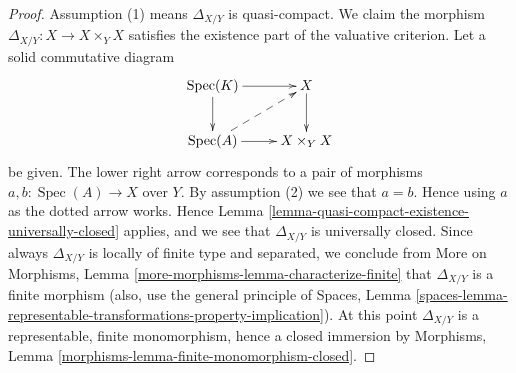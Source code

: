 \documentclass[10pt,a4paper]{amsart}
\theoremstyle{plain}
\theoremstyle{definition}
\theoremstyle{remark}
\numberwithin{equation}{subsection}
\def\Spec{\mathop{\mathrm{Spec}}}
\begin{document}
\begin{proof}
Assumption (1) means $\Delta_{X/Y}$ is quasi-compact.
We claim the morphism
$\Delta_{X/Y} : X \to X \times_Y X$ satisfies the existence
part of the valuative criterion.
Let a solid commutative diagram
$$
\xymatrix{
\Spec(K) \ar[r] \ar[d] & X \ar[d] \\
\Spec(A) \ar[r] \ar@{-->}[ru] & X \times_Y X
}
$$
be given. The lower right arrow corresponds to a
pair of morphisms $a, b : \Spec(A) \to X$ over $Y$.
By assumption (2) we see that $a = b$. Hence using $a$ as the dotted
arrow works. Hence
Lemma \ref{lemma-quasi-compact-existence-universally-closed}
applies, and we see that $\Delta_{X/Y}$ is universally closed.
Since always $\Delta_{X/Y}$ is locally of finite type and
separated, we conclude from
More on Morphisms, Lemma \ref{more-morphisms-lemma-characterize-finite}
that $\Delta_{X/Y}$ is a finite morphism (also, use the
general principle of
Spaces, Lemma
\ref{spaces-lemma-representable-transformations-property-implication}).
At this point $\Delta_{X/Y}$ is a representable, finite monomorphism,
hence a closed immersion by
Morphisms, Lemma \ref{morphisms-lemma-finite-monomorphism-closed}.
\end{proof}
\end{document}
